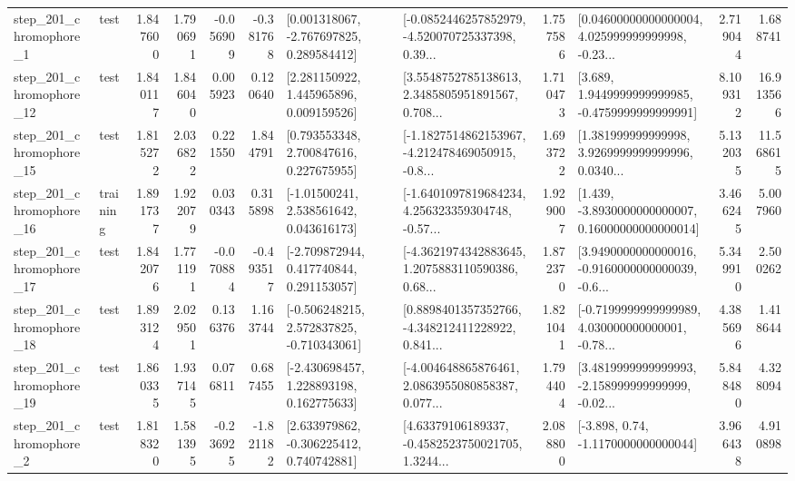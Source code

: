 \begin{tabular}{llrrrrllrlrr}
   step\_201\_chromophore\_1 &      test &      1.847600 &    1.790691 &     -0.056909 & -0.381768 &    [0.001318067, -2.767697825, 0.289584412] &  [-0.0852446257852979, -4.520070725337398, 0.39... &       1.757586 &  [0.04600000000000004, 4.025999999999998, -0.23... &            2.719044 &          1.688741 \\
  step\_201\_chromophore\_12 &      test &      1.840117 &    1.846040 &      0.005923 &  0.120640 &     [2.281150922, 1.445965896, 0.009159526] &  [3.5548752785138613, 2.3485805951891567, 0.708... &       1.710473 &   [3.689, 1.9449999999999985, -0.4759999999999991] &            8.109312 &         16.913566 \\
  step\_201\_chromophore\_15 &      test &      1.815272 &    2.036822 &      0.221550 &  1.844791 &     [0.793553348, 2.700847616, 0.227675955] &  [-1.1827514862153967, -4.212478469050915, -0.8... &       1.693722 &  [1.381999999999998, 3.9269999999999996, 0.0340... &            5.132035 &         11.568615 \\
  step\_201\_chromophore\_16 &  training &      1.891737 &    1.922079 &      0.030343 &  0.315898 &     [-1.01500241, 2.538561642, 0.043616173] &  [-1.6401097819684234, 4.256323359304748, -0.57... &       1.929007 &  [1.439, -3.8930000000000007, 0.16000000000000014] &            3.466245 &          5.007960 \\
  step\_201\_chromophore\_17 &      test &      1.842076 &    1.771191 &     -0.070884 & -0.493517 &    [-2.709872944, 0.417740844, 0.291153057] &  [-4.3621974342883645, 1.2075883110590386, 0.68... &       1.872370 &  [3.9490000000000016, -0.9160000000000039, -0.6... &            5.349910 &          2.500262 \\
  step\_201\_chromophore\_18 &      test &      1.893124 &    2.029501 &      0.136376 &  1.163744 &   [-0.506248215, 2.572837825, -0.710343061] &  [0.8898401357352766, -4.348212411228922, 0.841... &       1.821041 &  [-0.7199999999999989, 4.030000000000001, -0.78... &            4.385696 &          1.418644 \\
  step\_201\_chromophore\_19 &      test &      1.860335 &    1.937145 &      0.076811 &  0.687455 &    [-2.430698457, 1.228893198, 0.162775633] &  [-4.004648865876461, 2.0863955080858387, 0.077... &       1.794404 &  [3.4819999999999993, -2.158999999999999, -0.02... &            5.848480 &          4.328094 \\
   step\_201\_chromophore\_2 &      test &      1.818320 &    1.581395 &     -0.236925 & -1.821182 &    [2.633979862, -0.306225412, 0.740742881] &  [4.63379106189337, -0.4582523750021705, 1.3244... &       2.088800 &                [-3.898, 0.74, -1.1170000000000044] &            3.966438 &          4.910898 \\

\end{tabular}
